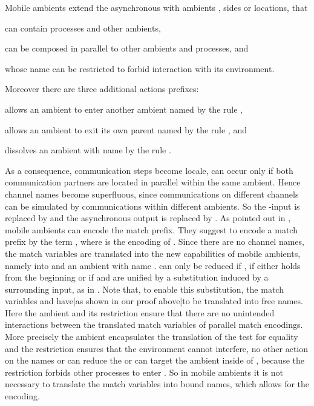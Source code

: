 \documentclass[]{article}
\begin{document}
Mobile ambients \cite{cardelliGordon00} extend the asynchronous \piCal with ambients , \ie sides or locations, that
\begin{inparaenum}[(a)]
	\item can contain processes and other ambients,
	\item can be composed in parallel to other ambients and processes, and
	\item whose name can be restricted to forbid interaction with its environment.
\end{inparaenum}
Moreover there are three additional actions prefixes:
\begin{inparaenum}[(1)]
	\item  allows an ambient to enter another ambient named  by the rule ,
	\item  allows an ambient to exit its own parent named  by the rule , and
	\item  dissolves an ambient with name  by the rule .
\end{inparaenum}
As a consequence, communication steps become locale, \ie can occur only if both communication partners are located in parallel within the same ambient. Hence channel names become superfluous, since communications on different channels can be simulated by communications within different ambients. So the -input  is replaced by  and the asynchronous output  is replaced by .
As pointed out in \cite{vig}, mobile ambients can encode the match prefix. They suggest to encode a match prefix  by the term , where  is the encoding of .
Since there are no channel names, the match variables are translated into the new capabilities of mobile ambients, namely into  and an ambient with name .  can only be reduced if , \ie if either  holds from the beginning or if  and  are unified by a substitution induced by a surrounding input, as \eg in . Note that, to enable this substitution, the match variables  and  {have}|{as} shown in our proof {above}|{to} be translated into free names. Here the ambient  and its restriction ensure that there are no unintended interactions between the translated match variables of parallel match encodings. More precisely the ambient  encapsulates the translation of the test for equality  and the restriction  ensures that the environment cannot interfere, \ie no other action on the names  or  can reduce the  or can target the ambient  inside of , because the restriction forbids other processes to enter . So in mobile ambients it is not necessary to translate the match variables into bound names, which allows for the encoding.
\end{document}
